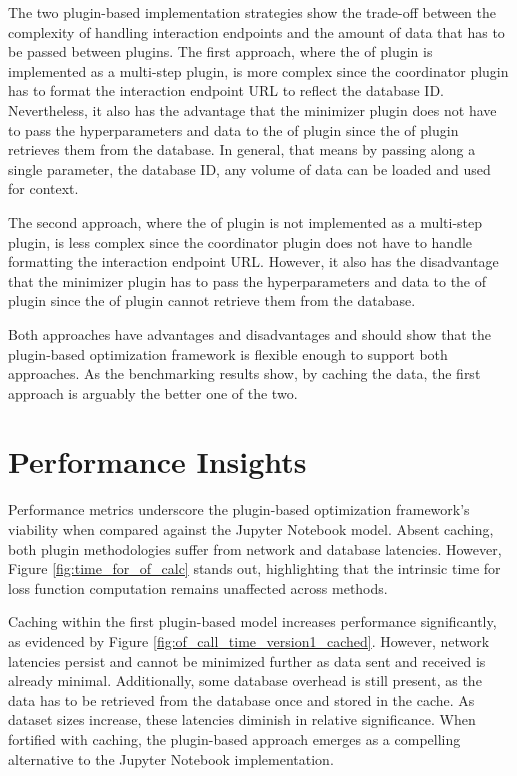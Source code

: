 \documentclass[
  a4paper,  %
  twoside,  %
  bibliography=totoc,
  headsepline,
  cleardoublepage=empty,
  parskip=half,
  draft=false
]{scrbook}
\begin{document}
The two plugin-based implementation strategies show the trade-off between the complexity of handling interaction endpoints and the amount of data that has to be passed between plugins.
The first approach, where the \gls{of} plugin is implemented as a multi-step plugin, is more complex since the coordinator plugin has to format the interaction endpoint URL to reflect the database ID.
Nevertheless, it also has the advantage that the minimizer plugin does not have to pass the hyperparameters and data to the \gls{of} plugin since the \gls{of} plugin retrieves them from the database.
In general, that means by passing along a single parameter, the database ID, any volume of data can be loaded and used for context.

The second approach, where the \gls{of} plugin is not implemented as a multi-step plugin, is less complex since the coordinator plugin does not have to handle formatting the interaction endpoint URL.
However, it also has the disadvantage that the minimizer plugin has to pass the hyperparameters and data to the \gls{of} plugin since the \gls{of} plugin cannot retrieve them from the database.

Both approaches have advantages and disadvantages and should show that the plugin-based optimization framework is flexible enough to support both approaches.
As the benchmarking results show, by caching the data, the first approach is arguably the better one of the two.

\section{Performance Insights}
\label{sec:performanceAnalysis}

Performance metrics underscore the plugin-based optimization framework's viability when compared against the Jupyter Notebook model.
Absent caching, both plugin methodologies suffer from network and database latencies.
However, Figure \ref{fig:time_for_of_calc} stands out, highlighting that the intrinsic time for loss function computation remains unaffected across methods.

Caching within the first plugin-based model increases performance significantly, as evidenced by Figure \ref{fig:of_call_time_version1_cached}.
However, network latencies persist and cannot be minimized further as data sent and received is already minimal.
Additionally, some database overhead is still present, as the data has to be retrieved from the database once and stored in the cache.
As dataset sizes increase, these latencies diminish in relative significance.
When fortified with caching, the plugin-based approach emerges as a compelling alternative to the Jupyter Notebook implementation.
\end{document}
